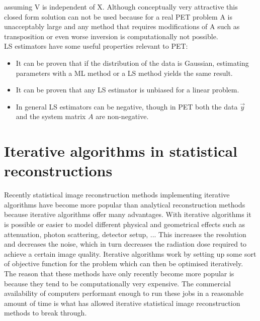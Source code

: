 \documentclass[report,12pt]{report}
\begin{document}
assuming V is independent of X. Although conceptually very attractive this closed form solution can not be used because for a real PET problem A is unacceptably large and any method that requires modifications of A such as transposition or even worse inversion is computationally not possible.\\

LS estimators have some useful properties relevant to PET:
\begin{itemize}
	\item It can be proven \cite{proof of ml equal ls} that if the distribution of the data is Gaussian, estimating parameters with a ML method or a LS method yields the same result.

	\item It can be proven \cite{proof of ml equal ls} that any LS estimator is unbiased for a linear problem. 

	\item In general LS estimators can be negative, though in PET both the data $\vec y$ and the system matrix $A$ are non-negative.
\end{itemize}





\section{Iterative algorithms in statistical reconstructions}
Recently statistical image reconstruction methods implementing iterative algorithms have become more popular than analytical reconstruction methods because iterative algorithms offer many advantages. With iterative algorithms it is possible or easier to model different physical and geometrical effects such as attenuation, photon scattering, detector setup, ... This increases the resolution and decreases the noise, which in turn decreases the radiation dose required to achieve a certain image quality. Iterative algorithms work by setting up some sort of objective function for the problem which can then be optimised iteratively.\\


The reason that these methods have only recently become more popular is because they tend to be computationally very expensive. The commercial availability of computers performant enough to run these jobs in a reasonable amount of time is what has allowed iterative statistical image reconstruction methods to break through.
\end{document}

